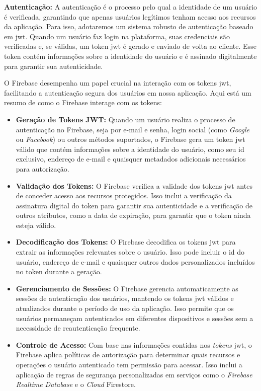 \textbf{Autenticação:}
A autenticação é o processo pelo qual a identidade de um usuário é verificada, garantindo que apenas usuários legítimos tenham acesso aos recursos da aplicação. Para isso, adotaremos um sistema robusto de autenticação baseado em \ac{jwt}. Quando um usuário faz login na plataforma, suas credenciais são verificadas e, se válidas, um token \acs{jwt} é gerado e enviado de volta ao cliente. Esse token contém informações sobre a identidade do usuário e é assinado digitalmente para garantir sua autenticidade.

O Firebase desempenha um papel crucial na interação com os tokens \acs{jwt}, facilitando a autenticação segura dos usuários em nossa aplicação. Aqui está um resumo de como o Firebase interage com os tokens:

\begin{itemize}
\item \textbf{Geração de Tokens JWT:}
Quando um usuário realiza o processo de autenticação no Firebase, seja por e-mail e senha, login social (como \textit{Google} ou \textit{Facebook}) ou outros métodos suportados, o Firebase gera um token \acs{jwt} válido que contém informações sobre a identidade do usuário, como seu \acs{id} exclusivo, endereço de e-mail e quaisquer metadados adicionais necessários para autorização.

\item \textbf{Validação dos Tokens:}
O Firebase verifica a validade dos tokens \acs{jwt} antes de conceder acesso aos recursos protegidos. Isso inclui a verificação da assinatura digital do token para garantir sua autenticidade e a verificação de outros atributos, como a data de expiração, para garantir que o token ainda esteja válido.

\item \textbf{Decodificação dos Tokens:}
O Firebase decodifica os tokens \acs{jwt} para extrair as informações relevantes sobre o usuário. Isso pode incluir o \acs{id} do usuário, endereço de e-mail e quaisquer outros dados personalizados incluídos no token durante a geração.

\item \textbf{Gerenciamento de Sessões:}
O Firebase gerencia automaticamente as sessões de autenticação dos usuários, mantendo os tokens \acs{jwt} válidos e atualizados durante o período de uso da aplicação. Isso permite que os usuários permaneçam autenticados em diferentes dispositivos e sessões sem a necessidade de reautenticação frequente.

\item \textbf{Controle de Acesso:}
Com base nas informações contidas nos \textit{tokens} \acs{jwt}, o Firebase aplica políticas de autorização para determinar quais recursos e operações o usuário autenticado tem permissão para acessar. Isso inclui a aplicação de regras de segurança personalizadas em serviços como o \textit{Firebase Realtime Database} e o \textit{Cloud} Firestore.

\end{itemize}

